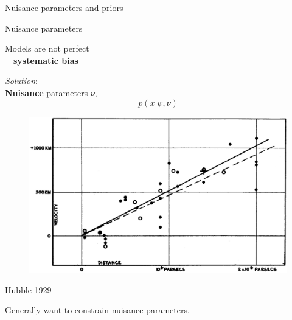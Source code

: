 \documentclass[
aspectratio=169,
14pt,
professionalfonts
]{beamer}
\newcommand{\arrow}{~\ding{220}~}
\begin{document}
\begin{frame}
    \center
    \Large
    Nuisance parameters and priors
    \end{frame}
    
    \begin{frame}{Nuisance parameters}

        \begin{minipage}{0.49\textwidth}
            Models are not perfect \\
            \arrow \textbf{systematic bias}

            \vspace{0.5cm}
            \textit{Solution}: \\
            \textbf{Nuisance} parameters $\nu$,
            $$p(x|\psi, \nu)$$
        \end{minipage}
        \begin{minipage}{0.49\textwidth}
            \begin{figure}
                \centering
                \includegraphics[width=\textwidth]{../plots/hubble.png}
            \end{figure}
            \flushright \small
            \href{https://www.pnas.org/doi/10.1073/pnas.15.3.168}{Hubble 1929}
        \end{minipage}
    \vspace{0.5cm}
    
    
    Generally want to constrain nuisance parameters.
    
\end{frame}
    
\end{document}
